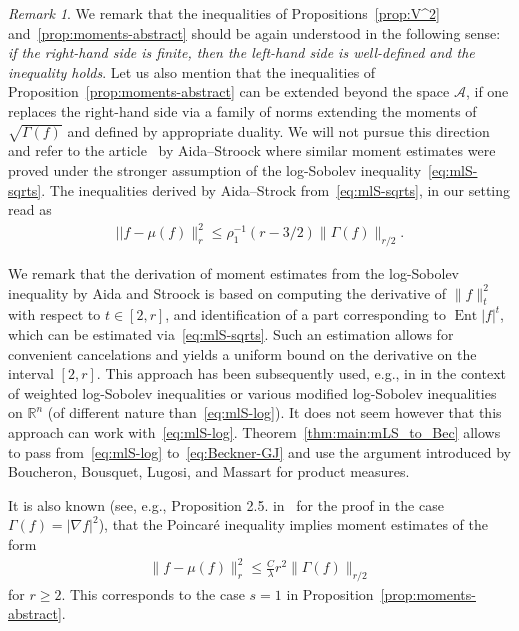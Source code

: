 \documentclass[a4paper]{amsart}
\theoremstyle{definition}
\theoremstyle{remark}
\newtheorem{remark}[theorem]{Remark}
\numberwithin{equation}{section}
\newcommand*{\RR}{\mathbb{R}}
\newcommand*{\calA}{\mathcal{A}}
\DeclareMathOperator{\Ent}{Ent}	%
\begin{document}
\begin{remark}We remark that the inequalities of Propositions~\ref{prop:V^2} and~\ref{prop:moments-abstract} should be again understood in the following sense: \emph{if the right-hand side is finite, then the left-hand side is well-defined and the inequality holds}. Let us also mention that the inequalities of Proposition~\ref{prop:moments-abstract} can be extended beyond the space $\calA$, if one replaces the right-hand side via a family of norms extending the moments of $\sqrt{\Gamma(f)}$ and defined by appropriate duality. We will not pursue this direction and refer to the article~\cite{MR1258492} by Aida--Stroock where similar moment estimates were proved under the stronger assumption of the log-Sobolev inequality~\eqref{eq:mlS-sqrts}. The inequalities derived by Aida--Strock from~\eqref{eq:mlS-sqrts}, in our setting read as
\begin{align}\label{eq:Aida-Stroock}
||f - \mu(f)\|_r^2 \le \rho_1^{-1} (r-3/2) \|\Gamma(f)\|_{r/2}.
\end{align}

We remark that the derivation of moment estimates from the log-Sobolev inequality by Aida and Stroock is based on computing the derivative of $\|f\|_t^2$ with respect to $t\in [2,r]$, and identification of a part corresponding to $\Ent |f|^t$, which can be estimated via~\eqref{eq:mlS-sqrts}. Such an estimation allows for convenient cancelations and yields a uniform bound on the derivative on the interval $[2,r]$. This approach has been subsequently used, e.g., in \cite{MR2510011,MR3383337,MR3743923} in the context of weighted log-Sobolev inequalities or various modified log-Sobolev inequalities on $\RR^n$ (of different nature than~\eqref{eq:mlS-log}). It does not seem however that this approach can work with~\eqref{eq:mlS-log}. Theorem~\ref{thm:main:mLS_to_Bec} allows to pass  from~\eqref{eq:mlS-log} to~\eqref{eq:Beckner-GJ} and use the argument introduced by Boucheron, Bousquet, Lugosi, and Massart for product measures.

It is also known (see, e.g., Proposition 2.5. in~\cite{MR2507637} for the proof in the case $\Gamma(f) = |\nabla f|^2$), that the Poincar\'e inequality implies moment estimates of the form
\begin{align}\label{eq:Poincare-moments}
\|f - \mu(f)\|_{r}^2 \le \frac{C}{\lambda} r^2 \|\Gamma(f)\|_{r/2}
\end{align}
for $r \ge 2$. This corresponds to the case $s=1$ in Proposition~\ref{prop:moments-abstract}.
\end{remark}
\end{document}
